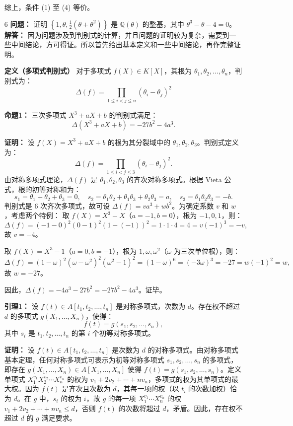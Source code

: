 \documentclass[UTF8]{ctexart}
\begin{document}
\begin{enumerate}
综上，条件 (1) 至 (4) 等价。



\item[6] 
\textbf{问题：} 证明 \(\left\{1, \theta, \frac{1}{2}(\theta + \theta^2)\right\}\) 是 \(\mathbb{Q}(\theta)\) 的整基，其中 \(\theta^3 - \theta - 4 = 0\)。\\
\textbf{解答：} 因为问题涉及到判别式的计算，并且问题的证明较为复杂，需要到一些中间结论，方可得证。所以首先给出基本定义和一些中间结论，再作完整证明。

\textbf{定义（多项式判别式）}
对于多项式 \(f(X) \in K[X]\)，其根为 \(\theta_1, \theta_2, \dots, \theta_n\)，判别式为：
\[
\Delta(f) = \prod_{1 \leq i < j \leq n} (\theta_i - \theta_j)^2
\]

\textbf{命题1：} 三次多项式 \( X^3 + aX + b \) 的判别式满足：
\[
\Delta(X^3 + aX + b) = -27b^2 - 4a^3.
\]

\textbf{证明：} 设 \( f(X) = X^3 + aX + b \) 的根为其分裂域中的 \( \theta_1, \theta_2, \theta_3 \)。判别式定义为：
\[
\Delta(f) = \prod_{1 \leqslant i < j \leqslant 3} (\theta_i - \theta_j)^2.
\]
由对称多项式理论，\(\Delta(f)\) 是 \( \theta_1, \theta_2, \theta_3 \) 的齐次对称多项式。根据 Vieta 公式，根的初等对称和为：
\[
s_1 = \theta_1 + \theta_2 + \theta_3 = 0, \quad s_2 = \theta_1 \theta_2 + \theta_1 \theta_3 + \theta_2 \theta_3 = a, \quad s_3 = \theta_1 \theta_2 \theta_3 = -b.
\]
判别式是 6 次齐次多项式，故可设 \(\Delta(f) = v a^3 + w b^2\)。为确定系数 \( v \) 和 \( w \)，考虑两个特例：
 取 \( f(X) = X^3 - X \)（\( a = -1, b = 0 \)），根为 \(-1, 0, 1\)，则：
  \[
  \Delta(f) = (-1 - 0)^2 (0 - 1)^2 (1 - (-1))^2 = 1 \cdot 1 \cdot 4 = 4 = v (-1)^3 = -v,
  \]
  故 \( v = -4 \)。
  
 取 \( f(X) = X^3 - 1 \)（\( a = 0, b = -1 \)），根为 \( 1, \omega, \omega^2 \)（\(\omega\) 为三次单位根），则：
  \[
  \Delta(f) = (1 - \omega)^2 (\omega - \omega^2)^2 (\omega^2 - 1)^2 = (1 - \omega)^6 = (-3\omega)^3 = -27 = w (-1)^2 = w,
  \]
  故 \( w = -27 \)。
  
因此，\(\Delta(f) = -4 a^3 - 27 b^2 = -27 b^2 - 4 a^3\)。证毕。

\textbf{引理1：} 设 \( f(t) \in A[t_1, t_2, \ldots, t_n] \) 是对称多项式，次数为 \( d \)。存在权不超过 \( d \) 的多项式 \( g(X_1, \ldots, X_n) \)，使得：
\[
f(t) = g(s_1, s_2, \ldots, s_n),
\]
其中 \( s_i \) 是 \( t_1, t_2, \ldots, t_n \) 的第 \( i \) 个初等对称多项式。

\textbf{证明：} 设 \( f(t) \in A[t_1, t_2, \ldots, t_n] \) 是次数为 \( d \) 的对称多项式。由对称多项式基本定理，任何对称多项式可表示为初等对称多项式 \( s_1, s_2, \ldots, s_n \) 的多项式，即存在 \( g(X_1, \ldots, X_n) \in A[X_1, \ldots, X_n] \) 使得 \( f(t) = g(s_1, s_2, \ldots, s_n) \)。定义单项式 \( X_1^{v_1} X_2^{v_2} \cdots X_n^{v_n} \) 的权为 \( v_1 + 2 v_2 + \cdots + n v_n \)，多项式的权为其单项式的最大权。因为 \( f(t) \) 是齐次且次数为 \( d \)，其每一项的权（以 \( t_i \) 的次数加权）恰为 \( d \)。在 \( g \) 中，\( s_i \) 的权为 \( i \)，故 \( g \) 的每一项 \( X_1^{v_1} \cdots X_n^{v_n} \) 的权 \( v_1 + 2 v_2 + \cdots + n v_n \leq d \)，否则 \( f(t) \) 的次数将超过 \( d \)，矛盾。因此，存在权不超过 \( d \) 的 \( g \) 满足要求。


\end{enumerate}
\end{document}
